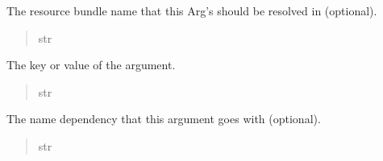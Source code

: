 \documentclass[letterpaper,10pt,english]{sphinxmanual}
\begin{document}
\begin{fulllineitems}
\begin{fulllineitems}
\begin{quote}
\begin{description}
\end{description}\end{quote}

\end{fulllineitems}


\begin{fulllineitems}
\label{\detokenize{apache_commons_validator_python:apache_commons_validator_python.arg_new.Arg.bundle}}
\pysigstartsignatures
{}
\pysigstopsignatures
\sphinxAtStartPar
The resource bundle name that this Arg’s  should be resolved in (optional).
\begin{quote}\begin{description}
\sphinxAtStartPar
str

\end{description}\end{quote}

\end{fulllineitems}


\begin{fulllineitems}
\label{\detokenize{apache_commons_validator_python:apache_commons_validator_python.arg_new.Arg.key}}
\pysigstartsignatures
{}
\pysigstopsignatures
\sphinxAtStartPar
The key or value of the argument.
\begin{quote}\begin{description}
\sphinxAtStartPar
str

\end{description}\end{quote}

\end{fulllineitems}


\begin{fulllineitems}
\label{\detokenize{apache_commons_validator_python:apache_commons_validator_python.arg_new.Arg.name}}
\pysigstartsignatures
{}
\pysigstopsignatures
\sphinxAtStartPar
The name dependency that this argument goes with (optional).
\begin{quote}\begin{description}
\sphinxAtStartPar
str


\end{description}
\end{quote}
\end{fulllineitems}
\end{fulllineitems}
\end{document}
